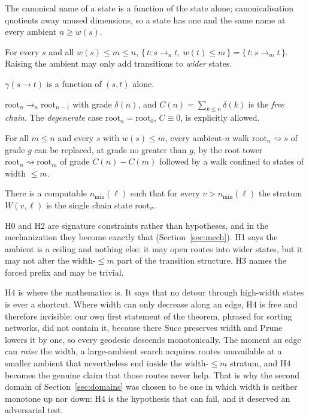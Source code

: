 \documentclass[11pt,a4paper]{article}
\theoremstyle{plain}
\theoremstyle{definition}
\theoremstyle{remark}
\newcommand{\wid}{w}
\newcommand{\nmin}{n_{\min}}
\newcommand{\Succ}{\mathrm{Succ}}
\newcommand{\Prune}{\mathrm{Prune}}
\begin{document}
\begin{description}\itemsep2pt
\item[H0 (ambient-free naming).] The canonical name of a state is a function of
  the state alone; canonicalisation quotients away unused dimensions, so a
  state has one and the same name at every ambient $n \ge \wid(s)$.
\item[H1 (ambient freedom, stratified).] For every $s$ and all
  $\wid(s) \le m \le n$,
  $\{\,t : s \to_n t,\ \wid(t) \le m\,\} = \{\,t : s \to_m t\,\}$.
  Raising the ambient may only add transitions to \emph{wider} states.
\item[H2 (ambient-free grading).] $\gamma(s \to t)$ is a function of $(s,t)$
  alone.
\item[H3 (root tower).] $\mathrm{root}_n \to_n \mathrm{root}_{n-1}$ with grade
  $\delta(n)$, and $C(n) = \sum_{k \le n} \delta(k)$ is the \emph{free chain}.
  The \emph{degenerate} case $\mathrm{root}_n = \mathrm{root}_0$, $C \equiv 0$,
  is explicitly allowed.
\item[H4 (width convexity).] For all $m \le n$ and every $s$ with
  $\wid(s) \le m$, every ambient-$n$ walk $\mathrm{root}_n \rightsquigarrow s$
  of grade $g$ can be replaced, at grade no greater than $g$, by the root tower
  $\mathrm{root}_n \rightsquigarrow \mathrm{root}_m$ of grade $C(n)-C(m)$
  followed by a walk confined to states of width $\le m$.
\item[H5 (gated tail).] There is a computable $\nmin(\ell)$ such that for every
  $v > \nmin(\ell)$ the stratum $W(v,\ell)$ is the single chain state
  $\mathrm{root}_v$.
\end{description}

H0 and H2 are signature constraints rather than hypotheses, and in the
mechanization they become exactly that (Section~\ref{sec:mech}). H1 says the
ambient is a ceiling and nothing else: it may open routes into wider states,
but it may not alter the width-$\le m$ part of the transition structure. H3
names the forced prefix and may be trivial.

H4 is where the mathematics is. It says that no detour through high-width
states is ever a shortcut. Where width can only decrease along an edge, H4 is
free and therefore invisible: our own first statement of the theorem, phrased
for sorting networks, did not contain it, because there $\Succ$ preserves width
and $\Prune$ lowers it by one, so every geodesic descends monotonically. The
moment an edge can \emph{raise} the width, a large-ambient search acquires
routes unavailable at a smaller ambient that nevertheless end inside the
width-$\le m$ stratum, and H4 becomes the genuine claim that those routes never
help. That is why the second domain of Section~\ref{sec:domains} was chosen to
be one in which width is neither monotone up nor down: H4 is the hypothesis
that can fail, and it deserved an adversarial test.
\end{document}
